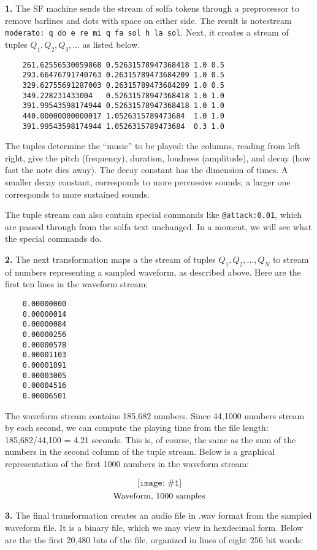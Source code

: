\documentclass[11pt]{amsart}
\newcommand{\fig}[3]{  \[\texttt{[image: \#1]}\] \[\hbox{#3}\] }
\begin{document}
{\bf 1.} The SF machine sends the stream of solfa tokens through
a preprocessor to remove barlines and dots with space on either side.
The result is notestream {\tt moderato: q do e re mi q fa sol  h la sol}.  Next,
it creates a stream
of tuples $Q_1, Q_2, Q_3, ...$ as listed below.
\begin{verbatim}
    261.62556530059868 0.52631578947368418 1.0 0.5 
    293.66476791740763 0.26315789473684209 1.0 0.5 
    329.62755691287003 0.26315789473684209 1.0 0.5 
    349.228231433004   0.52631578947368418 1.0 1.0 
    391.99543598174944 0.52631578947368418 1.0 1.0 
    440.00000000000017 1.0526315789473684  1.0 1.0 
    391.99543598174944 1.0526315789473684  0.3 1.0 
 \end{verbatim}
The tuples determine the ``music'' to be played: the
columns, reading from left right, give the pitch (frequency),
duration, loudness (amplitude), and decay (how fast the note dies away).
The decay constant has the dimension of times.  A smaller decay constant,
corresponds to more percussive sounds; a larger one corresponds to more sustained sounds.

The tuple stream can also contain special commands like {\tt @attack:0.01},
which are passed through from the solfa text unchanged.   In a moment, we will
see what the special commands do.

{\bf 2.} The next transformation maps a the stream of tuples $Q_1, Q_2, \ldots ,Q_N$ to 
stream of numbers representing a sampled waveform, as described above.  Here
are the first ten lines in the waveform stream:

\begin{verbatim}
    0.00000000
    0.00000014
    0.00000084
    0.00000256
    0.00000578
    0.00001103
    0.00001891
    0.00003005
    0.00004516
    0.00006501
\end{verbatim}

The waveform stream contains 185,682 numbers.  Since 44,1000 numbers stream by
each second, we can compute the playing time from the file length: 185,682/44,100 = 4.21
seconds.  This is, of course, the same as the sum of the numbers in the second column of the tuple 
stream.  Below is a graphical representation of the first 1000 numbers in the waveform stream:


\fig{plot1000}{0.5}{Waveform, 1000 samples}



{\bf 3.} The final transformation creates an audio file in .wav format from the sampled waveform file.
It is a binary file, which we may view in hexdecimal form.  Below are the the first 20,480 bits
of the file, organized in lines of eight 256 bit words:
\end{document}
